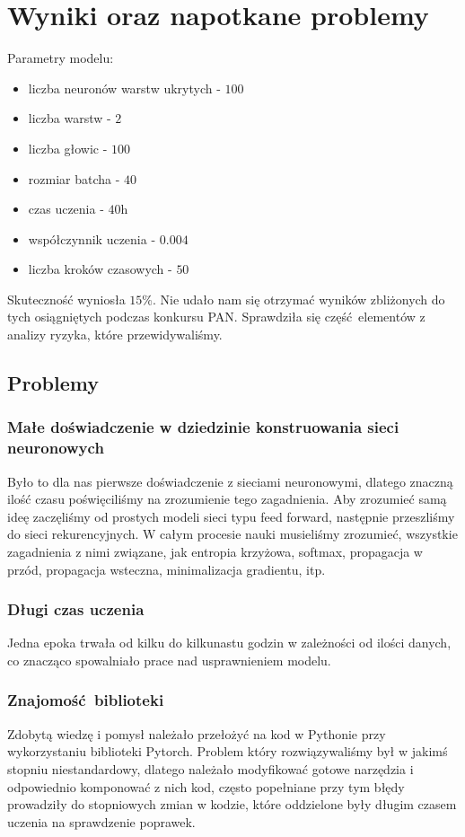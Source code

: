 \newpage
\section{Wyniki oraz napotkane problemy}

Parametry modelu:
\begin{itemize}
	  \item liczba neuronów warstw ukrytych - $100$
	  \item liczba warstw - $2$
	  \item liczba głowic - $100$
	  \item rozmiar batcha - $40$
	  \item czas uczenia - $40$h
	  \item współczynnik uczenia - $0.004$
	  \item liczba kroków czasowych - $50$
	\end{itemize}

Skuteczność wyniosła $15\%$. Nie udało nam się otrzymać wyników zbliżonych do tych osiągniętych podczas konkursu PAN. Sprawdziła się
część elementów z analizy ryzyka, które przewidywaliśmy.

\subsection{Problemy}
\subsubsection{Małe doświadczenie w dziedzinie konstruowania sieci neuronowych}
Było to dla nas pierwsze doświadczenie z sieciami neuronowymi, dlatego znaczną ilość czasu poświęciliśmy na
zrozumienie tego zagadnienia. Aby zrozumieć samą ideę zaczęliśmy od prostych modeli sieci typu feed forward,
następnie przeszliśmy do sieci rekurencyjnych. W całym procesie nauki musieliśmy zrozumieć,
wszystkie zagadnienia z nimi związane, jak entropia krzyżowa, softmax, propagacja w przód, propagacja wsteczna,
minimalizacja gradientu, itp.

\subsubsection{Długi czas uczenia}
Jedna epoka trwała od kilku do kilkunastu godzin w zależności od ilości danych, co znacząco spowalniało
prace nad usprawnieniem modelu.

\subsubsection{Znajomość biblioteki}
Zdobytą wiedzę i pomysł należało przełożyć na kod w Pythonie przy wykorzystaniu biblioteki Pytorch.
Problem który rozwiązywaliśmy był w jakimś stopniu niestandardowy, dlatego należało modyfikować
gotowe narzędzia i odpowiednio komponować z nich kod, często popełniane przy tym błędy prowadziły
do stopniowych zmian w kodzie, które oddzielone były długim czasem uczenia na sprawdzenie poprawek.

